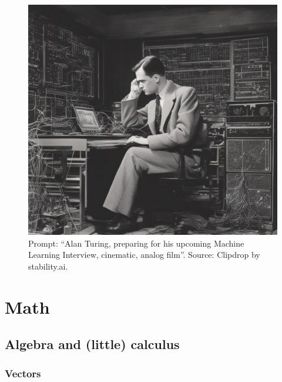 \documentclass{article}
\begin{document}
\newpage

\begin{figure}[t!]
    \centering
    \includegraphics[width=0.9\linewidth]{img/turing_2.jpg}
    \caption{Prompt: ``Alan Turing, preparing for his upcoming Machine Learning Interview, cinematic, analog film''. Source: Clipdrop by stability.ai.}
    \label{fig:enter-label}
\end{figure}

\newpage

\clearpage %

\section{Math}
\subsection{Algebra and (little) calculus}
\subsubsection{Vectors}
\end{document}
